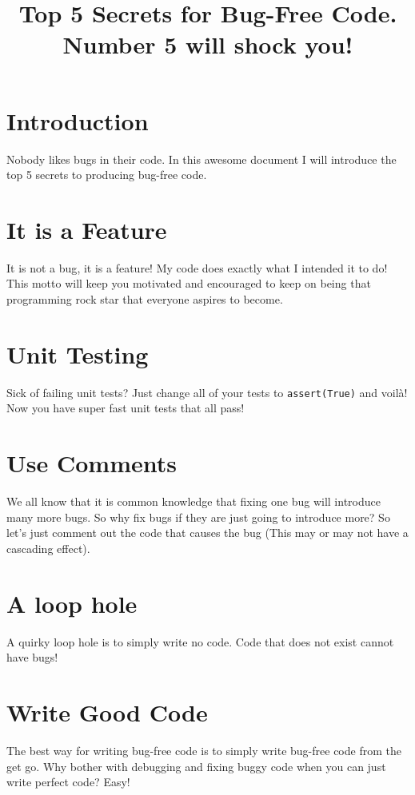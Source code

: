 \documentclass[11pt]{article}
\newcommand{\entity}[1]{{#1}}
\begin{document}
    \title{Top 5 Secrets for Bug-Free Code. Number 5 will shock you!}
    \maketitle

    \section{Introduction}
    Nobody likes \entity{bugs} in their \entity{code}. In this awesome document
     I will introduce the top 5 secrets to producing bug-free code.

    \section{It is a Feature}
    It is not a \entity{bug}, it is a \entity{feature}! My code does exactly
    what I intended it to do! This motto will keep you motivated and encouraged
    to keep on being that programming rock star that everyone aspires to become.

    \section{Unit Testing}
    Sick of failing \entity{unit tests}? Just change all of your tests to \verb|assert(True)|
    and voil\`a! Now you have super fast \entity{unit tests} that all pass!

    \section{Use Comments}
    We all know that it is common knowledge that fixing one \entity{bug} will introduce
    many more bugs. So why fix bugs if they are just going to introduce more?
    So let's just \entity{comment} out the code that causes the bug (This may or may
    not have a cascading effect).

    \section{A loop hole}
    A quirky \entity{loop hole} is to simply write no \entity{code}. Code that does not
    exist cannot have bugs!

    \section{Write Good Code}
    The best way for writing \entity{bug-free code} is to simply write
    \entity{bug-free code} from the get go. Why bother with debugging and
    fixing buggy code when you can just write perfect code? Easy!
\end{document}
